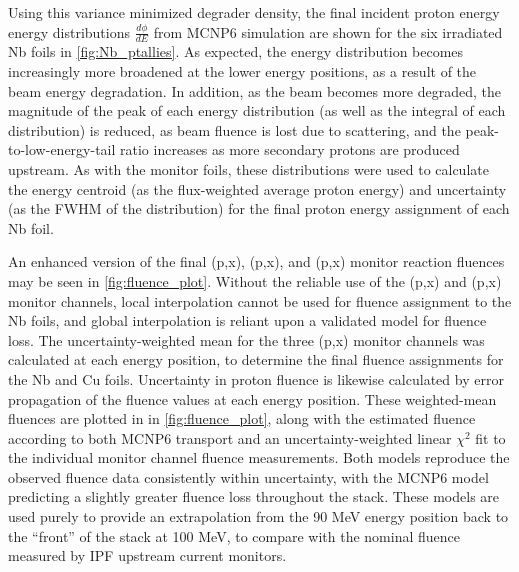 \documentclass[3p]{elsarticle}
\begin{document}
Using this variance minimized degrader density, the final incident proton energy energy distributions $\frac{d\phi}{dE}$ from MCNP6 simulation are shown for the six irradiated Nb foils in \autoref{fig:Nb_ptallies}. 
As expected, the energy distribution becomes increasingly more broadened at the lower energy positions, as a result of the beam energy degradation.
In addition, as the beam becomes more degraded, the magnitude of the peak of each energy distribution (as well as the integral of each distribution) is reduced, as beam fluence is lost due to scattering, and the peak-to-low-energy-tail ratio increases as more  secondary protons are produced upstream.
As with the monitor foils, these distributions were used to calculate the  energy centroid  (as the  flux-weighted average proton  energy) and  uncertainty (as the FWHM of the distribution) for the final proton energy assignment of each Nb foil.





An enhanced version of the final (p,x), (p,x), and (p,x) monitor reaction fluences may be seen in \autoref{fig:fluence_plot}.
Without the reliable use of the  (p,x) and (p,x) monitor channels, local interpolation cannot be used for fluence assignment to the Nb foils, and global interpolation is reliant upon a validated model for fluence loss.
The uncertainty-weighted mean  for the three (p,x) monitor channels was calculated at each energy position, to determine the final fluence assignments for the Nb and Cu foils.
Uncertainty in proton fluence  is likewise calculated by error propagation of the fluence values  at each energy position.
These weighted-mean fluences are  plotted in in \autoref{fig:fluence_plot}, along with the estimated fluence according to both  MCNP6 transport 
and an uncertainty-weighted linear $\chi^2$ fit to the individual monitor channel fluence measurements.
Both models reproduce the observed fluence data consistently within uncertainty, with the MCNP6 model predicting a slightly greater fluence loss throughout the stack.
These models are used purely to provide an extrapolation from the 90 MeV energy position back to the \enquote{front} of the stack at 100 MeV, to compare with the nominal fluence measured by  IPF upstream current monitors.
\end{document}
